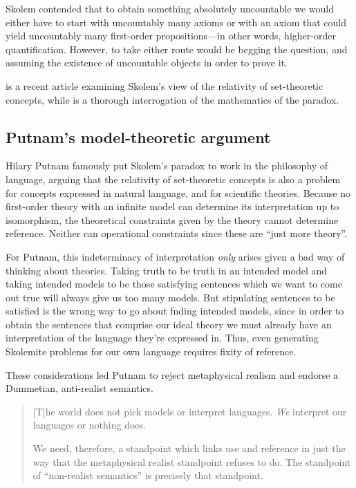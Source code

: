 \documentclass[10pt, a4paper, oneside]{article}
\theoremstyle{definition}
\theoremstyle{remark}
\theoremstyle{plain}
\theoremstyle{plain}
\begin{document}
Skolem contended that to obtain something absolutely uncountable we would either
have to start with uncountably many axioms or with an axiom that could yield
uncountably many first-order propositions---in other words, higher-order
quantification. However, to take either route would be begging the question,
and assuming the existence of uncountable objects in order to prove it.

\citet{jane2001} is a recent article examining Skolem's view of the relativity
of set-theoretic concepts, while \citet{bays2007} is a thorough interrogation of
the mathematics of the paradox.

\subsection{Putnam's model-theoretic argument}

Hilary Putnam \citeyearpar{putnam1980} famously put Skolem's paradox to work in
the philosophy of language, arguing that the relativity of set-theoretic
concepts is also a problem for concepts expressed in natural language, and for
scientific theories. Because no first-order theory with an infinite model can
determine its interpretation up to isomorphism, the theoretical constraints
given by the theory cannot determine reference. Neither can operational
constraints since these are ``just more theory''.

For Putnam, this indeterminacy of interpretation \emph{only} arises given a bad
way of thinking about theories. Taking truth to be truth in an intended model
and taking intended models to be those satisfying sentences which we want to
come out true will always give us too many models. But stipulating sentences to
be satisfied is the wrong way to go about fnding intended models, since in order
to obtain the sentences that comprise our ideal theory we must already have an
interpretation of the language they're expressed in. Thus, even generating
Skolemite problems for our own language requires fixity of reference.

These considerations led Putnam to reject metaphysical realism and endorse a
Dummetian, anti-realist semantics.

\begin{quote}
    [T]he world does not pick models or interpret languages. \emph{We} interpret
    our languages or nothing does.
    
    We need, therefore, a standpoint which links use and reference in just the
    way that the metaphysical realist standpoint refuses to do. The standpoint
    of ``non-realist semantics'' is precisely that standpoint.
    \citep[p. 482]{putnam1980}
\end{quote}
\end{document}
